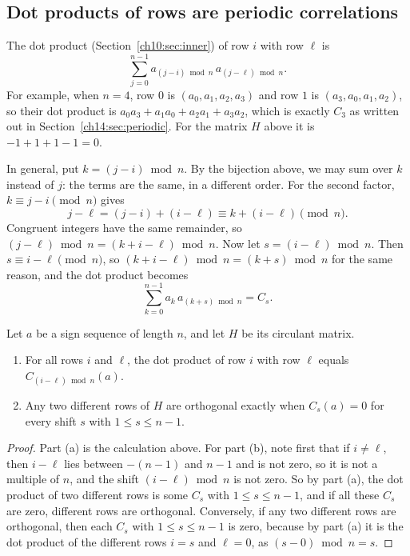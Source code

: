 \subsection*{Dot products of rows are periodic correlations}
The dot product (Section~\ref{ch10:sec:inner}) of row $i$ with row $\ell$ is
\[
 \sum_{j=0}^{n-1}a_{(j-i)\bmod n}\,a_{(j-\ell)\bmod n}.
\]
For example, when $n=4$, row $0$ is $(a_0,a_1,a_2,a_3)$ and row $1$ is $(a_3,a_0,a_1,a_2)$, so their dot product is $a_0a_3+a_1a_0+a_2a_1+a_3a_2$, which is exactly $C_3$ as written out in Section~\ref{ch14:sec:periodic}. For the matrix $H$ above it is $-1+1+1-1=0$.

In general, put $k=(j-i)\bmod n$. By the bijection above, we may sum over $k$ instead of $j$: the terms are the same, in a different order. For the second factor, $k\equiv j-i\pmod n$ gives
\[
 j-\ell=(j-i)+(i-\ell)\equiv k+(i-\ell)\pmod n.
\]
Congruent integers have the same remainder, so $(j-\ell)\bmod n=(k+i-\ell)\bmod n$. Now let $s=(i-\ell)\bmod n$. Then $s\equiv i-\ell\pmod n$, so $(k+i-\ell)\bmod n=(k+s)\bmod n$ for the same reason, and the dot product becomes
\[
 \sum_{k=0}^{n-1}a_k\,a_{(k+s)\bmod n}=C_s.
\]

\par\noindent\begin{minipage}{\linewidth}
\begin{proposition}\label{ch14:prop:rows}
Let $a$ be a sign sequence of length $n$, and let $H$ be its circulant matrix.
\begin{enumerate}
\item[(a)] For all rows $i$ and $\ell$, the dot product of row $i$ with row $\ell$ equals $C_{(i-\ell)\bmod n}(a)$.
\item[(b)] Any two different rows of $H$ are orthogonal exactly when $C_s(a)=0$ for every shift $s$ with $1\le s\le n-1$.
\end{enumerate}
\end{proposition}
\end{minipage}\par

\begin{proof}
Part (a) is the calculation above. For part (b), note first that if $i\ne\ell$, then $i-\ell$ lies between $-(n-1)$ and $n-1$ and is not zero, so it is not a multiple of $n$, and the shift $(i-\ell)\bmod n$ is not zero. So by part (a), the dot product of two different rows is some $C_s$ with $1\le s\le n-1$, and if all these $C_s$ are zero, different rows are orthogonal. Conversely, if any two different rows are orthogonal, then each $C_s$ with $1\le s\le n-1$ is zero, because by part (a) it is the dot product of the different rows $i=s$ and $\ell=0$, as $(s-0)\bmod n=s$.
\end{proof}

